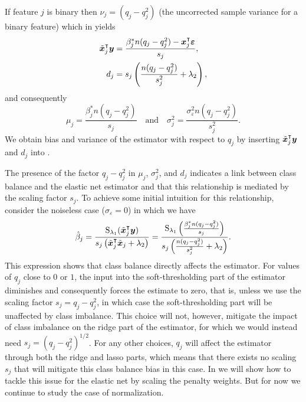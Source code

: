 If feature $j$ is binary then \(\nu_j = (q_j - q_j^2)\) (the uncorrected sample
variance for a binary feature) which in  yields
\begin{align*}
  \tilde{\boldsymbol{x}}_j^\intercal \boldsymbol{y} & = \frac{\beta_j^* n(q_j - q_j^2) - \boldsymbol{x}_j^\intercal \boldsymbol{\varepsilon}}{s_j}, \\
  d_j                          & = s_j \left(\frac{n(q_j - q_j^2)}{s_j^2} + \lambda_2\right),
\end{align*}
and consequently
\[
  \mu_j = \frac{\beta^*_j n(q_j - q_j^2)}{s_j}\quad \text{and} \quad \sigma_j^2 = \frac{\sigma_\varepsilon^2n(q_j- q_j^2)}{s^2_j}.
\]
%
We obtain bias and variance of the estimator with respect to \(q_j\) by inserting
\(\tilde{\boldsymbol{x}}_j^\intercal \boldsymbol{y}\) and \(d_j\) into .

The presence of the factor \(q_j - q_j^2\) in \(\mu_j\), \(\sigma_j^2\), and \(d_j\)
indicates a link between class balance and the elastic net estimator and that this
relationship is mediated by the scaling factor \(s_j\). To achieve some initial intuition
for this relationship, consider the noiseless case (\(\sigma_\varepsilon = 0\)) in which we
have
\begin{equation}
  \label{eq:noiseless-estimator}
  \hat{\beta}_j = \frac{\operatorname{S}_{\lambda_1}(\tilde{\boldsymbol{x}}_j^\intercal \boldsymbol{y})}{s_j\left(\tilde{\boldsymbol{x}}_j^\intercal \tilde{\boldsymbol{x}}_j + \lambda_2\right)}
  =
  \frac{\operatorname{S}_{\lambda_1}\left(\frac{\beta_j^* n (q_j - q_j^2)}{s_j}\right)}{s_j\left(\frac{n(q_j - q_j^2)}{s_j^2} + \lambda_2\right)}.
\end{equation}
%
This expression shows that class balance directly affects the estimator. For values of
\(q_j\) close to \(0\) or \(1\), the input into the soft-thresholding part of the estimator
diminishes and consequently forces the estimate to zero, that is, unless we use the scaling
factor \(s_j = q_j - q_j^2\), in which case the soft-thresholding part will be unaffected
by class imbalance. This choice will not, however, mitigate the impact of class imbalance
on the ridge part of the estimator, for which we would instead need \(s_j = (q_j -
q_j^2)^{1/2}\). For any other choices, \(q_j\) will affect the estimator through both the
ridge and lasso parts, which means that there exists no scaling \(s_j\) that will mitigate
this class balance bias in this case. In  we will show how to
tackle this issue for the elastic net by scaling the penalty weights. But for now we
continue to study the case of normalization.

